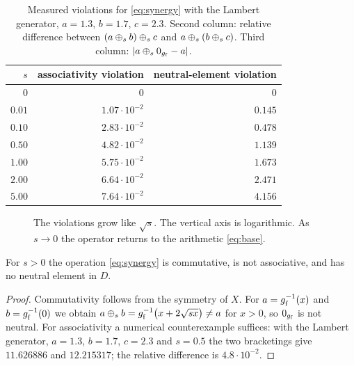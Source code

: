 \documentclass[11pt,a4paper]{article}
\begin{document}
\begin{table}[t]
\centering
\small
\caption{Measured violations for \eqref{eq:synergy} with the Lambert
generator, $a=1.3$, $b=1.7$, $c=2.3$. Second column: relative difference between
$(a\mathbin{\oplus}_s b)\mathbin{\oplus}_s c$ and $a\mathbin{\oplus}_s(b\mathbin{\oplus}_s c)$. Third column:
$|a\mathbin{\oplus}_s 0_{g_{\mathrm{f}}}-a|$.}
\label{tab:synergy}
\begin{tabular}{@{}rrr@{}}
\toprule
$s$ & associativity violation & neutral-element violation \\
\midrule
$0$     & $0$            & $0$ \\
$0.01$  & $1.07\cdot10^{-2}$ & $0.145$ \\
$0.10$  & $2.83\cdot10^{-2}$ & $0.478$ \\
$0.50$  & $4.82\cdot10^{-2}$ & $1.139$ \\
$1.00$  & $5.75\cdot10^{-2}$ & $1.673$ \\
$2.00$  & $6.64\cdot10^{-2}$ & $2.471$ \\
$5.00$  & $7.64\cdot10^{-2}$ & $4.156$ \\
\bottomrule
\end{tabular}
\end{table}

\begin{figure}[t]
\centering
{}
\caption{The violations grow like $\sqrt{s}$. The vertical axis is logarithmic.
As $s\to0$ the operator returns to the arithmetic \eqref{eq:base}.}
\label{fig:synergy}
\end{figure}

\begin{proposition}
\label{prop:synergy}
For $s>0$ the operation \eqref{eq:synergy} is commutative, is not associative,
and has no neutral element in $D$.
\end{proposition}

\begin{proof}
Commutativity follows from the symmetry of $X$. For $a=g_{\mathrm{f}}^{-1}(x)$ and
$b=g_{\mathrm{f}}^{-1}(0)$ we obtain $a\mathbin{\oplus}_{s}b=g_{\mathrm{f}}^{-1}\big(x+2\sqrt{sx}\big)\neq a$ for
$x>0$, so $0_{g_{\mathrm{f}}}$ is not neutral. For associativity a numerical
counterexample suffices: with the Lambert generator, $a=1.3$, $b=1.7$, $c=2.3$
and $s=0.5$ the two bracketings give $11.626886$ and $12.215317$; the relative
difference is $4.8\cdot10^{-2}$.
\end{proof}
\end{document}
